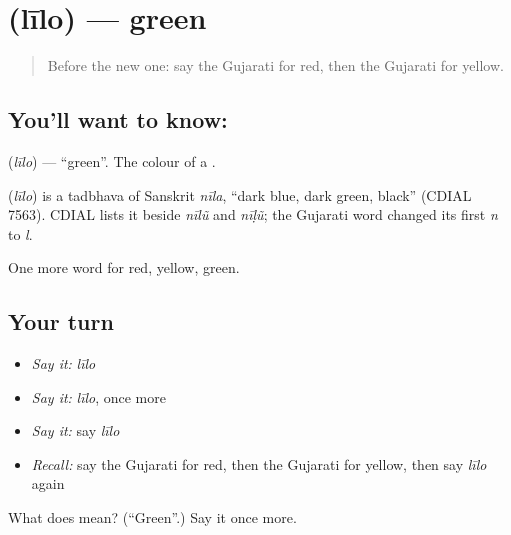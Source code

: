 \section[\texorpdfstring{\gu{લીલો} (līlo)}{લીલો (līlo)}]{ (līlo) — green}

\label{lesson:GU-C70-green}



\begin{quote}
Before the new one: say the Gujarati for red, then the Gujarati for yellow.
\end{quote}

\subsection*{You'll want to know: }
\textbf{} (\emph{līlo}) — \textquotedblleft{}green\textquotedblright{}. The colour of a \textbf{}.

\begin{cousinweb}
\textbf{} (\emph{līlo}) is a tadbhava of Sanskrit \emph{nīla}, \textquotedblleft{}dark blue, dark green, black\textquotedblright{} (CDIAL 7563). CDIAL lists it beside \emph{nīlũ} and \emph{nīḷũ}; the Gujarati word changed its first \emph{n} to \emph{l}.
\end{cousinweb}

\begin{grammarlens}[title={What you've built}]
One more word for red, yellow, green.
\end{grammarlens}

\subsection*{Your turn}
\begin{itemize}
\raggedright
  \item \emph{Say it:} \emph{līlo}
  \item \emph{Say it:} \emph{līlo}, once more
  \item \emph{Say it:} say \emph{līlo}
  \item \emph{Recall:} say the Gujarati for red, then the Gujarati for yellow, then say \emph{līlo} again
\end{itemize}

\begin{tcolorbox}[breakable,colback=teal!4,colframe=teal!35!black,title={Before you move on}]
What does  mean? (\textquotedblleft{}Green\textquotedblright{}.) Say it once more.
\end{tcolorbox}
